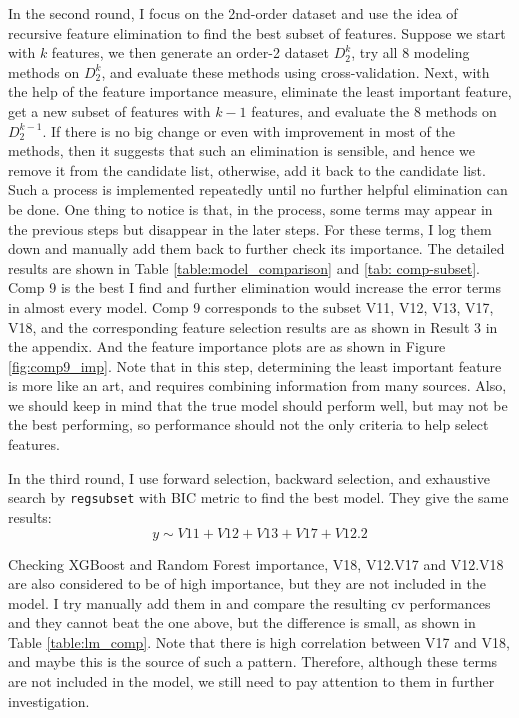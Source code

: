 \documentclass[11pt a4paper]{article}
\begin{document}
	In the second round, I focus on the 2nd-order dataset and use the idea of recursive feature elimination to find the best subset of features. Suppose we start with $k$ features, we then generate an order-2 dataset $D_2^k$, try all 8 modeling methods on $D_2^k$, and evaluate these methods using cross-validation. Next, with the help of the feature importance measure, eliminate the least important feature, get a new subset of features with $k-1$ features, and evaluate the 8 methods on $D_2^{k-1}$. If there is no big change or even with improvement in most of the methods, then it suggests that such an elimination is sensible, and hence we remove it from the candidate list, otherwise, add it back to the candidate list. Such a process is implemented repeatedly until no further helpful elimination can be done. One thing to notice is that, in the process, some terms may appear in the previous steps but disappear in the later steps. For these terms, I log them down and manually add them back to further check its importance. The detailed results are shown in Table \ref{table:model_comparison} and \ref{tab: comp-subset}. Comp 9 is the best I find and further elimination would increase the error terms in almost every model. Comp 9 corresponds to the subset {V11, V12, V13, V17, V18}, and the corresponding feature selection results are as shown in Result 3 in the appendix. And the feature importance plots are as shown in Figure \ref{fig:comp9_imp}. Note that in this step, determining the least important feature is more like an art, and requires combining information from many sources. Also, we should keep in mind that the true model should perform well, but may not be the best performing, so performance should not the only criteria to help select features.
	
	In the third round, I use forward selection, backward selection, and exhaustive search by \texttt{regsubset} with BIC metric to find the best model. They give the same results: 
	\[y \sim V11 + V12 + V13 + V17 + V12.2\]
	
	Checking XGBoost and Random Forest importance, V18, V12.V17 and V12.V18 are also considered to be of high importance, but they are not included in the model. I try manually add them in and compare the resulting cv performances and they cannot beat the one above, but the difference is small, as shown in Table \ref{table:lm_comp}. Note that there is high correlation between V17 and V18, and maybe this is the source of such a pattern. Therefore, although these terms are not included in the model, we still need to pay attention to them in further investigation.
	
\end{document}
